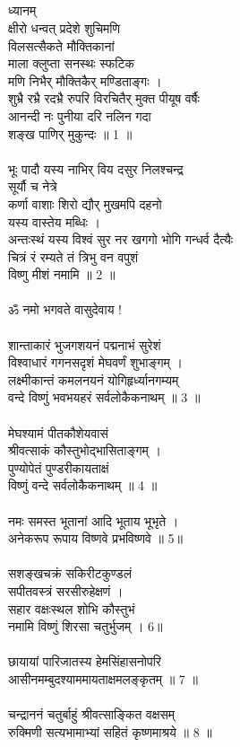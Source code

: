 \subsection{}
ध्यानम्\\
क्षीरो धन्वत् प्रदेशे शुचिमणि \\
विलसत्सैकते मौक्तिकानां\\
माला क्लुप्ता सनस्थः स्फटिक\\
मणि निभैर् मौक्तिकैर् मण्डिताङ्गः ।\\
शुभ्रै रभ्रै रदभ्रै रुपरि विरचितैर् मुक्त पीयूष वर्षैः\\
आनन्दी नः पुनीया दरि नलिन गदा \\
शङ्ख पाणिर् मुकुन्दः ॥ 1 ॥\\
\\
भूः पादौ यस्य नाभिर् विय दसुर निलश्चन्द्र \\
सूर्यौ च नेत्रे\\
कर्णा वाशाः शिरो द्यौर् मुखमपि दहनो \\
यस्य वास्तेय मब्धिः ।\\
अन्तःस्थं यस्य विश्वं सुर नर खगगो भोगि गन्धर्व दैत्यैः\\
चित्रं रं रम्यते तं त्रिभु वन वपुशं \\
विष्णु मीशं नमामि ॥ 2 ॥\\
\\
ॐ नमो भगवते वासुदेवाय !\\
\\
शान्ताकारं भुजगशयनं पद्मनाभं सुरेशं\\
विश्वाधारं गगनसदृशं मेघवर्णं शुभाङ्गम् ।\\
लक्ष्मीकान्तं कमलनयनं योगिहृर्ध्यानगम्यम्\\
वन्दे विष्णुं भवभयहरं सर्वलोकैकनाथम् ॥ 3 ॥\\
\\
मेघश्यामं पीतकौशेयवासं\\
श्रीवत्साकं कौस्तुभोद्भासिताङ्गम् ।\\
पुण्योपेतं पुण्डरीकायताक्षं\\
विष्णुं वन्दे सर्वलोकैकनाथम् ॥ 4 ॥\\
\\
नमः समस्त भूतानां आदि भूताय भूभृते ।\\
अनेकरूप रूपाय विष्णवे प्रभविष्णवे ॥ 5॥\\
\\
सशङ्खचक्रं सकिरीटकुण्डलं\\
सपीतवस्त्रं सरसीरुहेक्षणं ।\\
सहार वक्षःस्थल शोभि कौस्तुभं\\
नमामि विष्णुं शिरसा चतुर्भुजम् । 6॥\\
\\
छायायां पारिजातस्य हेमसिंहासनोपरि\\
आसीनमम्बुदश्याममायताक्षमलङ्कृतम् ॥ 7 ॥\\
\\
चन्द्राननं चतुर्बाहुं श्रीवत्साङ्कित वक्षसम्\\
रुक्मिणी सत्यभामाभ्यां सहितं कृष्णमाश्रये ॥ 8 ॥\\
